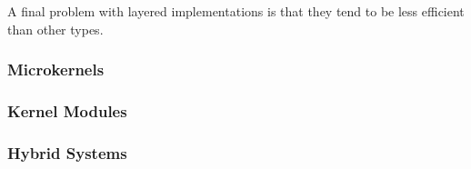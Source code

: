 A final problem with layered implementations is that they tend to be less efficient than other types.

\subsubsection{Microkernels}\label{subsubsec:Microkernels}
\subsubsection{Kernel Modules}\label{subsubsec:Kernel_Modules}
\subsubsection{Hybrid Systems}\label{subsubsec:Hybrid_Systems}

